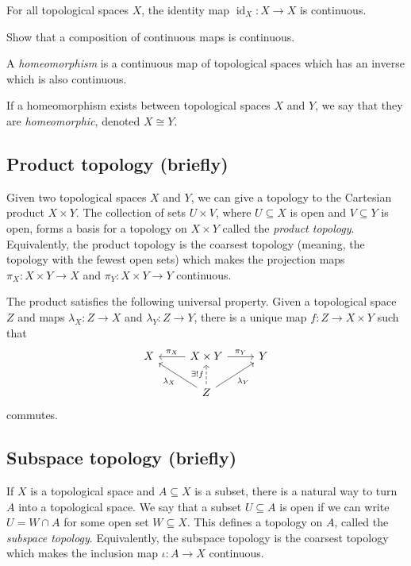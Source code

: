 \documentclass[a4paper,11pt]{article}
\begin{document}
    \begin{example}
      For all topological spaces \(X\), the identity map \(\operatorname{id}_X: X \to X\) is continuous.
    \end{example}

    \begin{exercise}
      Show that a composition of continuous maps is continuous.
    \end{exercise}

    \begin{definition}
      A \emph{homeomorphism} is a continuous map of topological spaces which has an inverse which is also continuous.

      If a homeomorphism exists between topological spaces \(X\) and \(Y\), we say that they are \emph{homeomorphic}, denoted \(X \cong Y\).
    \end{definition}

    \subsection{Product topology (briefly)}
    Given two topological spaces \(X\) and \(Y\), we can give a topology to the Cartesian product \(X \times Y\). The collection of sets \(U \times V\), where \(U \subseteq X\) is open and \(V \subseteq Y\) is open, forms a basis for a topology on \(X \times Y\) called the \emph{product topology}. Equivalently, the product topology is the coarsest topology (meaning, the topology with the fewest open sets) which makes the projection maps \(\pi_X: X \times Y \to X\) and \(\pi_Y: X \times Y \to Y\) continuous.

    The product satisfies the following universal property. Given a topological space \(Z\) and maps \(\lambda_X: Z \to X\) and \(\lambda_Y: Z \to Y\), there is a unique map \(f: Z \to X \times Y\) such that
    \[
      \begin{tikzcd}
        X & X \times Y \arrow[l,"\pi_X"'] \arrow[r,"\pi_Y"] & Y \\
        {} & Z \arrow[ul,"\lambda_X"] \arrow[ur,"\lambda_Y"'] \arrow[u,"\exists!f",dashed] & {}
      \end{tikzcd}
    \]
    commutes.

    \subsection{Subspace topology (briefly)}
    If \(X\) is a topological space and \(A \subseteq X\) is a subset, there is a natural way to turn \(A\) into a topological space. We say that a subset \(U \subseteq A\) is open if we can write \(U = W \cap A\) for some open set \(W \subseteq X\). This defines a topology on \(A\), called the \emph{subspace topology}. Equivalently, the subspace topology is the coarsest topology which makes the inclusion map \(\iota: A \to X\) continuous.
\end{document}
